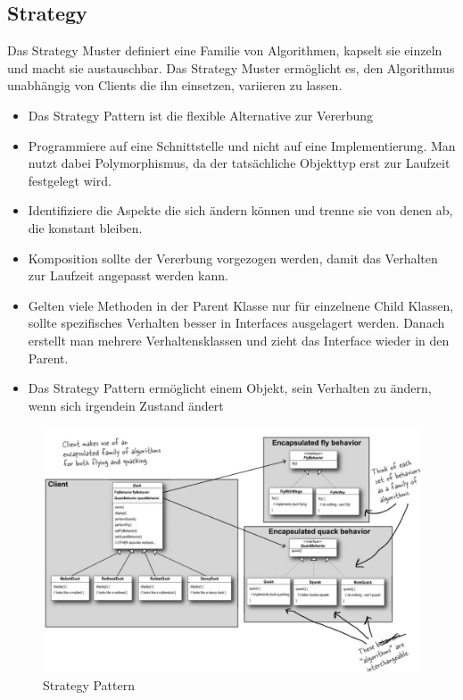 \subsection{Strategy}
\label{sec:strategy}
Das Strategy Muster definiert eine Familie von Algorithmen, kapselt sie einzeln und macht sie austauschbar. Das Strategy Muster ermöglicht es, den Algorithmus unabhängig von Clients die ihn einsetzen, variieren zu lassen.
\begin{itemize}
	\item Das Strategy Pattern ist die flexible Alternative zur Vererbung
	\item Programmiere auf eine Schnittstelle und nicht auf eine Implementierung. Man nutzt dabei Polymorphismus, da der tatsächliche Objekttyp erst zur Laufzeit festgelegt wird.
	\item Identifiziere die Aspekte die sich ändern können und trenne sie von denen ab, die konstant bleiben.
	\item Komposition sollte der Vererbung vorgezogen werden, damit das Verhalten zur Laufzeit angepasst werden kann.
	\item Gelten viele Methoden in der Parent Klasse nur für einzelnene Child Klassen, sollte spezifisches Verhalten besser in Interfaces ausgelagert werden. Danach erstellt man mehrere Verhaltensklassen und zieht das Interface wieder in den Parent.
	\item Das Strategy Pattern ermöglicht einem Objekt, sein Verhalten zu ändern, wenn sich irgendein Zustand ändert
\end{itemize}

\begin{figure}[h]
	\centering
	\includegraphics[width=\linewidth]{images/strategy_pattern}
	\caption{Strategy Pattern}
	\label{fig:strategypattern}
\end{figure}


